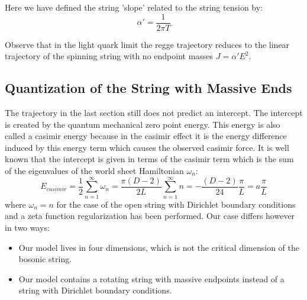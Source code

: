 \documentclass[11pt,a4paper]{article}
\begin{document}
Here we have defined the string 'slope' related to the string tension by:
\begin{equation}
\alpha'=\frac{1}{2\pi T}
\end{equation}

Observe that in the light quark limit the regge trajectory reduces to the linear trajectory of the spinning string with no endpoint masses $J=\alpha'E^2$.

\subsection{Quantization of the String with Massive Ends}
The trajectory in the last section still does not predict an intercept. The intercept is created by the quantum mechanical zero point energy. This energy is also called a casimir energy because in the casimir effect it is the energy difference induced by this energy term which causes the  observed casimir force. It is well known that the intercept is given in terms of the casimir term which is the sum of the eigenvalues of the world sheet Hamiltonian $\omega_n$:
\begin{equation}
E_{casimir}=\frac{1}{2}\sum_{n=1}^\infty \omega_n=\frac{\pi (D-2)}{2L}\sum_{n=1}^\infty n=-\frac{(D-2)}{24}\frac{\pi}{L}=a\frac{\pi}{L}
\end{equation}
where $\omega_n=n$ for the case of the open string with Dirichlet boundary conditions and a zeta function regularization has been performed. Our case differs however in two ways:
\begin{itemize}
\item Our model lives in four dimensions, which is not the critical dimension of the bosonic string.
\item Our model contains a rotating string with massive endpoints instead of a string with Dirichlet boundary conditions.
\end{itemize}
\end{document}
